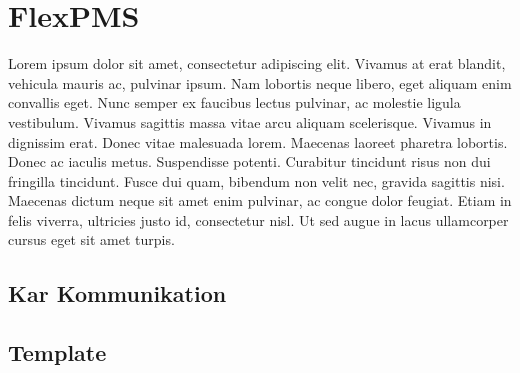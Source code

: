\section{FlexPMS}
Lorem ipsum dolor sit amet, consectetur adipiscing elit. Vivamus at erat blandit, vehicula mauris ac, pulvinar ipsum. Nam lobortis neque libero, eget aliquam enim convallis eget. Nunc semper ex faucibus lectus pulvinar, ac molestie ligula vestibulum. Vivamus sagittis massa vitae arcu aliquam scelerisque. Vivamus in dignissim erat. Donec vitae malesuada lorem. Maecenas laoreet pharetra lobortis. Donec ac iaculis metus. Suspendisse potenti. Curabitur tincidunt risus non dui fringilla tincidunt. Fusce dui quam, bibendum non velit nec, gravida sagittis nisi. Maecenas dictum neque sit amet enim pulvinar, ac congue dolor feugiat. Etiam in felis viverra, ultricies justo id, consectetur nisl. Ut sed augue in lacus ullamcorper cursus eget sit amet turpis.\\


\subsection{Kar Kommunikation}


\subsection{Template}
